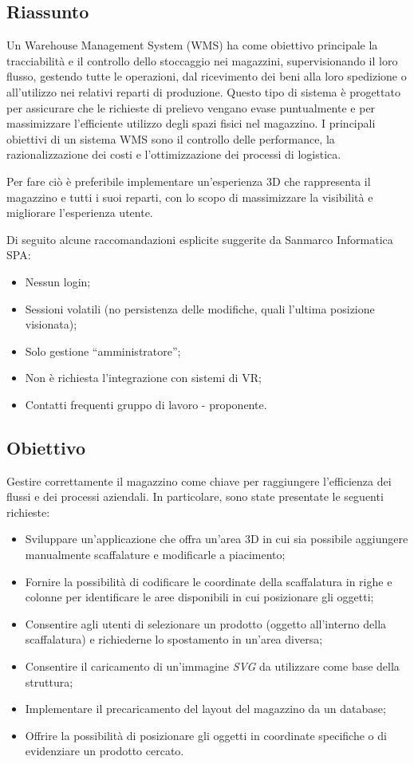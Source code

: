 \documentclass{article}
\begin{document}
\subsection{Riassunto}
Un Warehouse Management System (WMS) ha come obiettivo principale la tracciabilità e il controllo dello stoccaggio nei magazzini, supervisionando il loro flusso, gestendo tutte le operazioni, dal ricevimento dei beni alla loro spedizione o all'utilizzo nei relativi reparti di produzione. Questo tipo di sistema è progettato per assicurare che le richieste di prelievo vengano evase puntualmente e per massimizzare l'efficiente utilizzo degli spazi fisici nel magazzino.
I principali obiettivi di un sistema WMS sono il controllo delle performance, la razionalizzazione dei costi e l'ottimizzazione dei processi di logistica. 

Per fare ciò è preferibile implementare un’esperienza 3D che rappresenta il magazzino e tutti i suoi reparti, con lo scopo di massimizzare la visibilità e migliorare l’esperienza utente.

Di seguito alcune raccomandazioni esplicite suggerite da Sanmarco Informatica SPA:
\begin{itemize}
    \item Nessun login;
    \item Sessioni volatili (no persistenza delle modifiche, quali l’ultima posizione visionata);
    \item Solo gestione “amministratore”;  
    \item Non è richiesta l’integrazione con sistemi di VR;
    \item Contatti frequenti gruppo di lavoro - proponente.
\end{itemize}
\subsection{Obiettivo}
Gestire correttamente il magazzino come chiave per raggiungere l’efficienza dei flussi e dei processi aziendali.
In particolare, sono state presentate le seguenti richieste:

\begin{itemize}
    \item Sviluppare un'applicazione che offra un'area 3D in cui sia possibile aggiungere manualmente scaffalature e modificarle a piacimento;
    \item Fornire la possibilità di codificare le coordinate della scaffalatura in righe e colonne per identificare le aree disponibili in cui posizionare gli oggetti;
    \item Consentire agli utenti di selezionare un prodotto (oggetto all'interno della scaffalatura) e richiederne lo spostamento in un'area diversa;
    \item Consentire il caricamento di un'immagine \textit{SVG} da utilizzare come base della struttura;
    \item Implementare il precaricamento del layout del magazzino da un database;
    \item Offrire la possibilità di posizionare gli oggetti in coordinate specifiche o di evidenziare un prodotto cercato.
\end{itemize}
\end{document}
